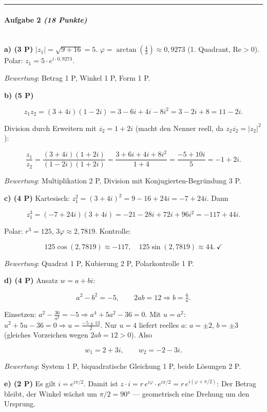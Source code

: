 \documentclass[11pt, a4paper]{article}
\begin{document}
\noindent\textcolor{rulegray}{\rule{\linewidth}{0.4pt}}


\paragraph{Aufgabe 2 \textit{(18 Punkte)}}\mbox{}\\[2pt]

\textbf{a) (3 P)} $|z_1| = \sqrt{9+16}=5$. $\varphi = \arctan(\tfrac{4}{3}) \approx 0{,}9273$ (1. Quadrant, $\text{Re}>0$). Polar: $z_1 = 5\cdot e^{i\cdot 0{,}9273}$.

\textit{Bewertung}: Betrag 1 P, Winkel 1 P, Form 1 P.


\textbf{b) (5 P)}

\[
z_1 z_2 = (3+4i)(1-2i) = 3-6i+4i-8i^2 = 3-2i+8 = 11-2i.
\]

Division durch Erweitern mit $\overline{z_2} = 1+2i$ (macht den Nenner reell, da $z_2\overline{z_2}=|z_2|^2$):

\[
\frac{z_1}{z_2} = \frac{(3+4i)(1+2i)}{(1-2i)(1+2i)} = \frac{3+6i+4i+8i^2}{1+4} = \frac{-5+10i}{5} = -1+2i.
\]

\textit{Bewertung}: Multiplikation 2 P, Division mit Konjugierten-Begründung 3 P.


\textbf{c) (4 P)} Kartesisch: $z_1^2 = (3+4i)^2 = 9-16+24i = -7+24i$. Dann

\[
z_1^3 = (-7+24i)(3+4i) = -21-28i+72i+96i^2 = -117+44i.
\]

Polar: $r^3 = 125$, $3\varphi \approx 2{,}7819$. Kontrolle:

\[
125\cos(2{,}7819) \approx -117,\quad 125\sin(2{,}7819) \approx 44.\ \checkmark
\]

\textit{Bewertung}: Quadrat 1 P, Kubierung 2 P, Polarkontrolle 1 P.


\textbf{d) (4 P)} Ansatz $w=a+bi$:

\[
a^2-b^2=-5,\qquad 2ab=12 \Rightarrow b=\tfrac{6}{a}.
\]

Einsetzen: $a^2 - \tfrac{36}{a^2} = -5 \Rightarrow a^4+5a^2-36=0$. Mit $u=a^2$: $u^2+5u-36=0 \Rightarrow u = \tfrac{-5\pm 13}{2}$. Nur $u=4$ liefert reelles $a$: $a=\pm 2$, $b=\pm 3$ (gleiches Vorzeichen wegen $2ab=12>0$). Also

\[
w_1 = 2+3i,\qquad w_2 = -2-3i.
\]

\textit{Bewertung}: System 1 P, biquadratische Gleichung 1 P, beide Lösungen 2 P.


\textbf{e) (2 P)} Es gilt $i = e^{i\pi/2}$. Damit ist $z\cdot i = r\,e^{i\varphi}\cdot e^{i\pi/2} = r\,e^{i(\varphi+\pi/2)}$: Der Betrag bleibt, der Winkel wächst um $\pi/2 = 90°$ — geometrisch eine Drehung um den Ursprung.
\end{document}
